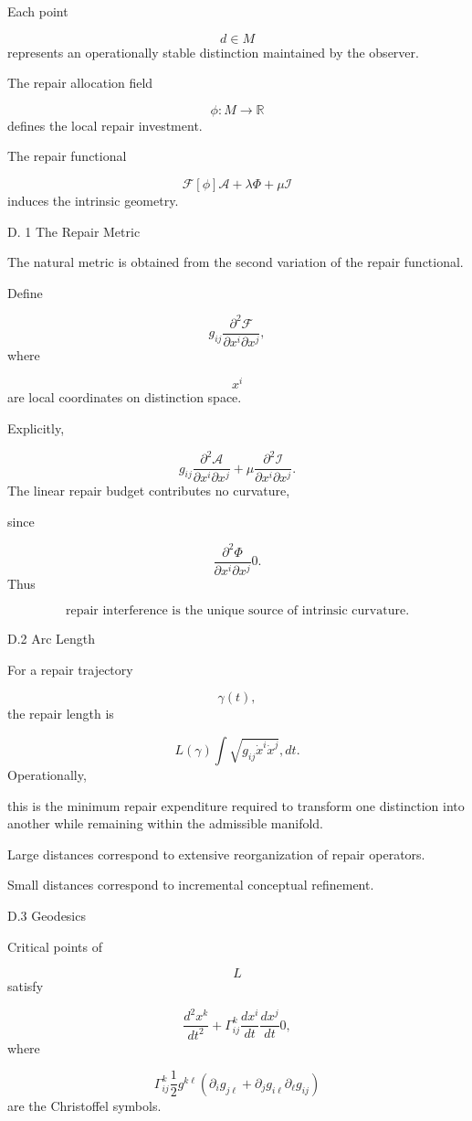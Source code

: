 \documentclass[12pt,oneside]{article}
\theoremstyle{plain}
\theoremstyle{definition}
\theoremstyle{remark}
\begin{document}
Each point

\[
d\in M
\]
represents an operationally stable distinction maintained by the observer.

The repair allocation field

\[
\phi:M\rightarrow\mathbb R
\]
defines the local repair investment.

The repair functional

\[
\mathcal F[\phi]
\mathcal A
+
\lambda\Phi
+
\mu\mathcal I
\]
induces the intrinsic geometry.

D. 1 The Repair Metric

The natural metric is obtained from the second variation of the repair functional.

Define

\[
g_{ij}
\frac{\partial^2\mathcal F}
{\partial x^i\partial x^j},
\]
where

\[
x^i
\]
are local coordinates on distinction space.

Explicitly,

\[
g_{ij}
\frac{\partial^2\mathcal A}
{\partial x^i\partial x^j}
+
\mu
\frac{\partial^2\mathcal I}
{\partial x^i\partial x^j}.
\]
The linear repair budget contributes no curvature,

since

\[
\frac{\partial^2\Phi}
{\partial x^i\partial x^j}
0. 
\]
Thus

\[
\boxed{
\text{repair interference is the unique source of intrinsic curvature.}
}
\]

D.2 Arc Length

For a repair trajectory

\[
\gamma(t),
\]
the repair length is

\[
L(\gamma)
\int
\sqrt{
g_{ij}
\dot x^i
\dot x^j
}
,dt.
\]
Operationally,

this is the minimum repair expenditure required to transform one distinction into another while remaining within the admissible manifold.

Large distances correspond to extensive reorganization of repair operators.

Small distances correspond to incremental conceptual refinement.


D.3 Geodesics

Critical points of

\[
L
\]
satisfy

\[
\frac{d^2x^k}{dt^2}
+
\Gamma^k_{ij}
\frac{dx^i}{dt}
\frac{dx^j}{dt}
0,
\]
where

\[
\Gamma^k_{ij}
\frac12
g^{k\ell}
(
\partial_i g_{j\ell}
+
\partial_j g_{i\ell}
\partial_\ell g_{ij}
)
\]
are the Christoffel symbols.
\end{document}
